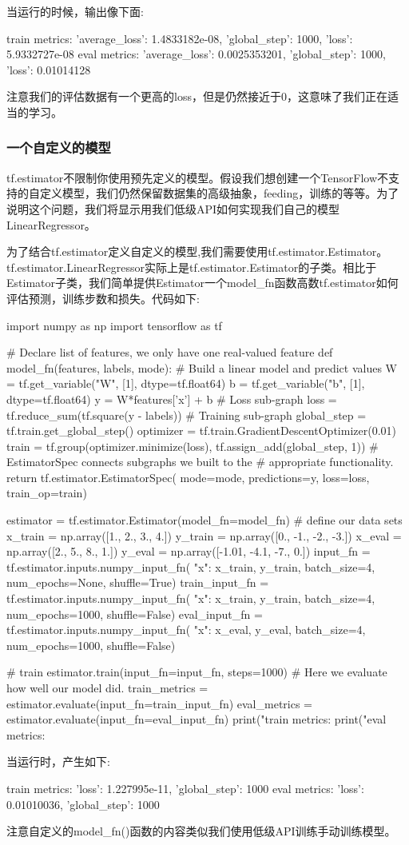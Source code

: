 当运行的时候，输出像下面:
\begin{pythoncode}
train metrics: {'average_loss': 1.4833182e-08, 'global_step': 1000, 'loss': 5.9332727e-08}
eval metrics: {'average_loss': 0.0025353201, 'global_step': 1000, 'loss': 0.01014128}
\end{pythoncode}
注意我们的评估数据有一个更高的loss，但是仍然接近于0，这意味了我们正在适当的学习。
\subsubsection{一个自定义的模型}
tf.estimator不限制你使用预先定义的模型。假设我们想创建一个TensorFlow不支持的自定义模型，我们仍然保留数据集的高级抽象，feeding，训练的等等。为了说明这个问题，我们将显示用我们低级API如何实现我们自己的模型LinearRegressor。

为了结合tf.estimator定义自定义的模型,我们需要使用tf.estimator.Estimator。tf.estimator.LinearRegressor实际上是tf.estimator.Estimator的子类。相比于Estimator子类，我们简单提供Estimator一个model\_fn函数高数tf.estimator如何评估预测，训练步数和损失。代码如下:
\begin{pythoncode}
import numpy as np
import tensorflow as tf

# Declare list of features, we only have one real-valued feature
def model_fn(features, labels, mode):
  # Build a linear model and predict values
  W = tf.get_variable("W", [1], dtype=tf.float64)
  b = tf.get_variable("b", [1], dtype=tf.float64)
  y = W*features['x'] + b
  # Loss sub-graph
  loss = tf.reduce_sum(tf.square(y - labels))
  # Training sub-graph
  global_step = tf.train.get_global_step()
  optimizer = tf.train.GradientDescentOptimizer(0.01)
  train = tf.group(optimizer.minimize(loss),
                   tf.assign_add(global_step, 1))
  # EstimatorSpec connects subgraphs we built to the
  # appropriate functionality.
  return tf.estimator.EstimatorSpec(
      mode=mode,
      predictions=y,
      loss=loss,
      train_op=train)

estimator = tf.estimator.Estimator(model_fn=model_fn)
# define our data sets
x_train = np.array([1., 2., 3., 4.])
y_train = np.array([0., -1., -2., -3.])
x_eval = np.array([2., 5., 8., 1.])
y_eval = np.array([-1.01, -4.1, -7., 0.])
input_fn = tf.estimator.inputs.numpy_input_fn(
    {"x": x_train}, y_train, batch_size=4, num_epochs=None, shuffle=True)
train_input_fn = tf.estimator.inputs.numpy_input_fn(
    {"x": x_train}, y_train, batch_size=4, num_epochs=1000, shuffle=False)
eval_input_fn = tf.estimator.inputs.numpy_input_fn(
    {"x": x_eval}, y_eval, batch_size=4, num_epochs=1000, shuffle=False)

# train
estimator.train(input_fn=input_fn, steps=1000)
# Here we evaluate how well our model did.
train_metrics = estimator.evaluate(input_fn=train_input_fn)
eval_metrics = estimator.evaluate(input_fn=eval_input_fn)
print("train metrics: %
print("eval metrics: %
\end{pythoncode}
当运行时，产生如下:
\begin{pythoncode}
train metrics: {'loss': 1.227995e-11, 'global_step': 1000}
eval metrics: {'loss': 0.01010036, 'global_step': 1000}
\end{pythoncode}
注意自定义的model\_fn()函数的内容类似我们使用低级API训练手动训练模型。








